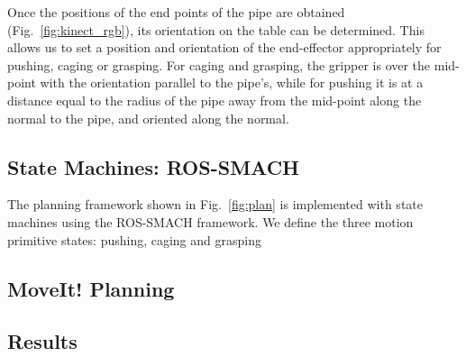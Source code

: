 \documentclass[runningheads,letterpaper]{llncs}
\begin{document}
Once the positions of the end points of the pipe are obtained (Fig.~\ref{fig:kinect_rgb}), its orientation on the table can be determined. This allows us to set a position and orientation of the end-effector appropriately for pushing, caging or grasping. For caging and grasping, the gripper is over the mid-point with the orientation parallel to the pipe's, while for pushing it is at a distance equal to the radius of the pipe away from the mid-point along the normal to the pipe, and oriented along the normal.

\subsection{State Machines: ROS-SMACH}
The planning framework shown in Fig.~\ref{fig:plan} is implemented with state machines using the ROS-SMACH framework. We define the three motion primitive states: pushing, caging and grasping


\subsection{MoveIt! Planning}

\subsection{Results}



\end{document}
